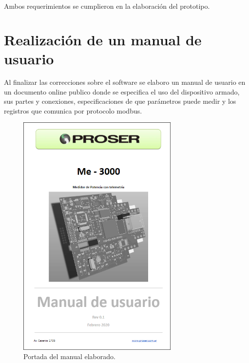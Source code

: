 Ambos requerimientos se cumplieron en la elaboración del prototipo.

\section{Realización de un manual de usuario}

Al finalizar las correcciones sobre el software se elaboro un manual de usuario en un documento online publico donde se especifica el uso del dispositivo armado, sus partes y conexiones, especificaciones de que parámetros puede medir y los registros que comunica por protocolo modbus.


\begin{figure}[!htb]
	\centering
	\includegraphics[width=80mm,keepaspectratio]{Figures/portadamanual.png}
	\caption{Portada del manual elaborado.}
	\label{fig:proto1}
\end{figure}

